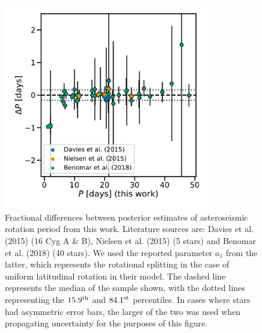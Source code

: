 \begin{figure}[h!]
 \centering
 \includegraphics[width=0.8\textwidth]{Images/seis_comparison_rot_alt2.pdf}
 \caption{Fractional differences between posterior estimates of asteroseismic rotation period from this work. Literature sources are: Davies et al. (2015) \cite{m_davies+2015} (16 Cyg A \& B), Nielsen et al. (2015) \cite{m_nielsen+2015} (5 stars) and Benomar et al. (2018) \cite{m_benomar+2018} (40 stars). We used the reported parameter $a_{1}$ from the latter, which represents the rotational splitting in the case of uniform latitudinal rotation in their model. The dashed line represents the median of the sample shown, with the dotted lines representing the $15.9^{\rm{th}}$ and $84.1^{\rm{st}}$ percentiles. In cases where stars had asymmetric error bars, the larger of the two was used when propagating uncertainty for the purposes of this figure.}
 \label{fig:literaturecomp}
\end{figure}

